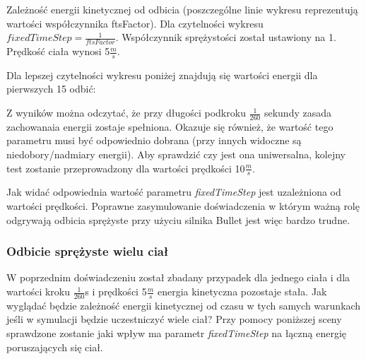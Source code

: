 

Zależność energii kinetycznej od odbicia (poszczególne linie wykresu
reprezentują wartości współczynnika ftsFactor). Dla czytelności wykresu $
fixedTimeStep = \frac{1}{ftsFactor} $. Współczynnik sprężystości został
ustawiony na 1. Prędkość ciała wynosi 5$\frac{m}{s}$.



Dla lepszej czytelności wykresu poniżej znajdują się wartości energii dla
pierwszych 15 odbić:



Z wyników można odczytać, że przy długości podkroku $ \frac{1}{260} $ sekundy
zasada zachowanaia energii zostaje spełniona. Okazuje się również, że wartość
tego parametru musi być odpowiednio dobrana (przy innych widoczne są
niedobory/nadmiary energii). Aby sprawdzić czy jest ona uniwersalna, kolejny
test zostanie przeprowadzony dla wartości prędkości 10$\frac{m}{s}$.



Jak widać odpowiednia wartość parametru \emph{fixedTimeStep} jest uzależniona od
wartości prędkości. Poprawne zasymulowanie doświadczenia w którym ważną rolę
odgrywają odbicia sprężyste przy użyciu silnika Bullet jest więc bardzo trudne.

\subsubsection{Odbicie sprężyste wielu ciał}

W poprzednim doświadczeniu został zbadany przypadek dla jednego ciała i dla
wartości kroku $ \frac{1}{260} $s i prędkości 5$ \frac{m}{s} $ energia
kinetyczna pozostaje stała. Jak wyglądać będzie zależność energii kinetycznej od
czasu w tych samych warunkach jeśli w symulacji będzie uczestniczyć wiele ciał?
Przy pomocy poniższej sceny sprawdzone zostanie jaki wpływ ma parametr
\emph{fixedTimeStep} na łączną energię poruszających się ciał.

